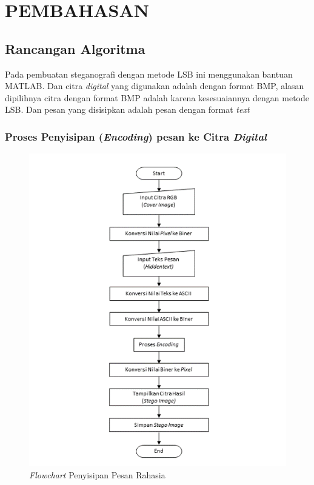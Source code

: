 
\chapter{PEMBAHASAN}

\section{Rancangan Algoritma}
Pada pembuatan steganografi dengan metode LSB ini menggunakan bantuan MATLAB. Dan citra \emph{digital} yang digunakan adalah dengan format BMP, alasan dipilihnya citra dengan format BMP adalah karena kesesuaiannya dengan metode LSB. Dan pesan yang disisipkan adalah pesan dengan format \emph{text}

	\subsection{Proses Penyisipan (\emph{Encoding}) pesan ke Citra \emph{Digital}}
	
	\begin{figure}[H]
		\centering
		\includegraphics[width=1\textwidth]{gambar/penyisipan3}
		\caption{\emph{Flowchart} Penyisipan Pesan Rahasia}
		\label{flowchart_penyisipan}
	\end{figure}


